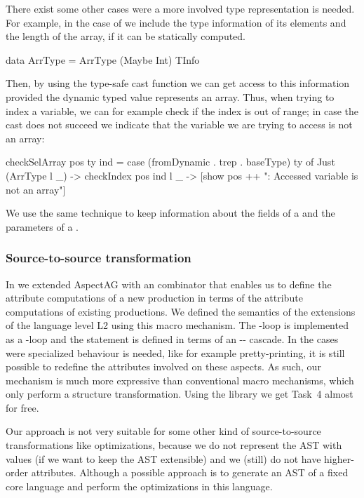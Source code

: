 There exist some other cases were a more involved type representation is needed.
For example, in the case of  we include the type information of its elements 
and the length of the array, if it can be statically computed.
\begin{haskell}
data ArrType = ArrType (Maybe Int) TInfo 
\end{haskell}
Then, by using the type-safe cast function  we can get access to 
this information provided the dynamic typed value represents an array.
Thus, when trying to index a variable, we can for example check if the index is out of range;
in case the cast does not succeed we  indicate that the variable we are trying to access is not an array:
\begin{haskell}
checkSelArray pos ty ind
  = case (fromDynamic . trep . baseType) ty of
     Just (ArrType l _) -> checkIndex pos ind l
     _                  -> [show pos ++ 
                            ": Accessed variable is not an array"] 
\end{haskell}
We use the same technique to keep information about the fields of a 
and the parameters of a .

\subsubsection{Source-to-source transformation}

In \cite{VS12} we extended AspectAG with an  combinator that enables us
to define the attribute computations of a new production in terms of the attribute computations of existing productions.
We defined the semantics of the extensions of the language level L2 using this macro mechanism.
The -loop is implemented as a -loop 
and the  statement is defined in terms of an -- cascade.
In the cases were specialized behaviour is needed, like for example pretty-printing, it is still possible to redefine the attributes
involved on these aspects. As such, our mechanism is much more expressive than conventional macro mechanisms, which only perform a structure transformation. Using the library we get Task~4 almost for free.

Our approach is not very suitable for some other kind of source-to-source transformations like optimizations,
because we do not represent the AST with values (if we want to keep the AST extensible) and
we (still) do not have higher-order attributes.
Although a possible approach is to generate an AST of a fixed core language and perform 
the optimizations in this language.

